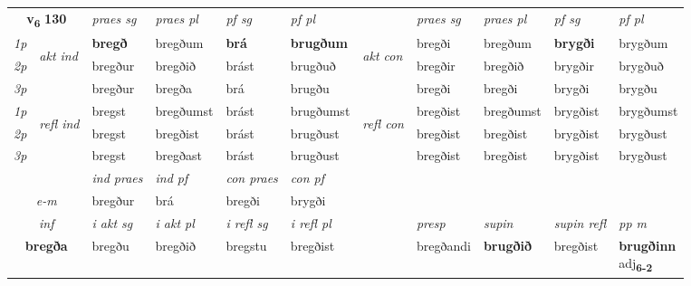 \noindent
\begin{tabular}{lllllllllll} \toprule
\multicolumn{2}{c}{\textbf{v{\textsubscript{6}}} \Large{\textbf{130}}}  &  \textit{praes sg}  & \textit{praes pl}  &\textit{ pf sg} & \textit{pf pl} &  &  \textit{praes sg}  & \textit{praes pl}  & \textit{pf sg} & \textit{pf pl } \\*
	\cmidrule{3-6} \cmidrule{8-11}
 {\textit{1p}} & \multirow{3}{*}{\begin{turn}{90}\textit{akt ind}\end{turn}} & \textbf{bregð} & bregðum & \textbf{brá} & \textbf{brugðum} & \multirow{3}{*}{\begin{turn}{90}\textit{akt con}\end{turn}} &bregði & bregðum & \textbf{brygði} & brygðum\\*
 {\textit{2p}} &  &  bregður  & bregðið & brást & brugðuð & & bregðir & bregðið & brygðir & brygðuð \\*
{\textit{3p}} &  & bregður & bregða & brá & brugðu & & bregði & bregði& brygði & brygðu \\*
\cmidrule{3-6} \cmidrule{8-11}
 {\textit{1p}} & \multirow{3}{*}{\begin{turn}{90}\textit{refl ind}\end{turn}}  & bregst & bregðumst & brást & brugðumst & \multirow{3}{*}{\begin{turn}{90}\textit{refl con}\end{turn}}  &bregðist & bregðumst & brygðist & brygðumst \\*
 {\textit{2p}} &  & bregst & bregðist & brást & brugðust & &bregðist & bregðist & brygðist & brygðust \\*
 {\textit{3p}}  & & bregst & bregðast & brást & brugðust & & bregðist & bregðist& brygðist & brygðust \\*
\cmidrule{3-6} \cmidrule{8-11}

   & &  \textit{ind praes} & \textit{ind pf} & \textit{con praes} & \textit{con pf} \\*
\multicolumn{2}{c}{ \textit{e-m} } & bregður & brá & bregði & brygði \\*

\cmidrule{3-11}
   \multicolumn{2}{c}{\textit{inf}}  & \textit{i akt sg} & \textit{i akt pl} & \textit{i refl sg} & \textit{i refl pl} && \textit{presp} & \textit{supin} & \textit{supin refl} & \textit{pp m} \\*
  \multicolumn{2}{c}{\textbf{bregða}} & bregðu  & bregðið & bregstu & bregðist && bregðandi &  \textbf{brugðið} & bregðist & \specialcell{\textbf{brugðinn} \\ adj\textbf{\textsubscript{6-2}}} \\*
\end{tabular}

